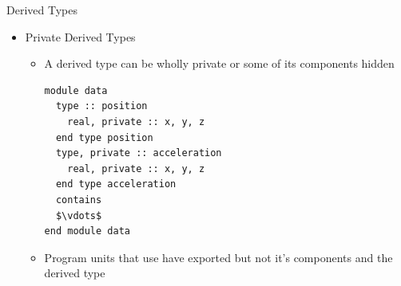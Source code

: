 \documentclass[10pt,t]{beamer}
\begin{document}
\begin{frame}{Derived Types}
\begin{itemize}
  \item Private Derived Types
    \begin{itemize}
      \item A derived type can be wholly private or some of its components hidden
        \begin{lstlisting}[language={[90]Fortran},basicstyle=\fontsize{5}{6}\selectfont\ttfamily,mathescape]
module data
  type :: position
    real, private :: x, y, z
  end type position
  type, private :: acceleration
    real, private :: x, y, z
  end type acceleration
  contains
  $\vdots$
end module data
          \end{lstlisting}
      \item Program units that use  have  exported but not it's components  and the derived type 
    \end{itemize}
  \end{itemize}
\end{frame}
\end{document}
